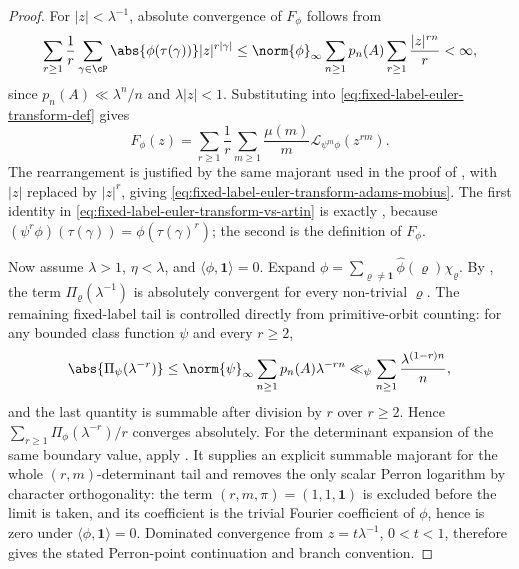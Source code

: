 \begin{proof}
  For \(|z|<\lambda^{-1}\), absolute convergence of \(F_\phi\) follows
  from
  \[
    \sum_{r\ge1}\frac{1}{r}
      \sum_{\gamma\in\cP}\abs{\phi(\tau(\gamma))}|z|^{r|\gamma|}
    \le
    \norm{\phi}_\infty
    \sum_{n\ge1}p_n(A)\sum_{r\ge1}\frac{|z|^{rn}}{r}
    <\infty,
  \]
  since \(p_n(A)\ll\lambda^n/n\) and \(\lambda|z|<1\). Substituting
   into
  \eqref{eq:fixed-label-euler-transform-def} gives
  \[
    F_\phi(z)
    =
    \sum_{r\ge1}\frac{1}{r}
      \sum_{m\ge1}\frac{\mu(m)}{m}
        \mathcal L_{\psi^m\phi}(z^{rm}).
  \]
  The rearrangement is justified by the same majorant used in the proof
  of , with \(|z|\) replaced by
  \(|z|^r\), giving \eqref{eq:fixed-label-euler-transform-adams-mobius}.
  The first identity in
  \eqref{eq:fixed-label-euler-transform-vs-artin} is exactly
  , because
  \((\psi^r\phi)(\tau(\gamma))=\phi(\tau(\gamma)^r)\); the second is the
  definition of \(F_\phi\).

  Now assume \(\lambda>1\), \(\eta<\lambda\), and
  \(\langle\phi,\mathbf1\rangle=0\). Expand
  \(\phi=\sum_{\varrho\neq\mathbf1}\widehat\phi(\varrho)\chi_\varrho\).
  By , the term
  \(\Pi_\varrho(\lambda^{-1})\) is absolutely convergent for every
  non-trivial \(\varrho\).  The remaining fixed-label tail is controlled
  directly from primitive-orbit counting: for any bounded class function
  \(\psi\) and every \(r\ge2\),
  \[
    \abs{\Pi_\psi(\lambda^{-r})}
    \le
    \norm{\psi}_\infty\sum_{n\ge1}p_n(A)\lambda^{-rn}
    \ll_\psi
    \sum_{n\ge1}\frac{\lambda^{(1-r)n}}{n},
  \]
  and the last quantity is summable after division by \(r\) over
  \(r\ge2\). Hence \(\sum_{r\ge1}\Pi_\phi(\lambda^{-r})/r\) converges
  absolutely. For the determinant expansion of the same boundary value, apply
  . It supplies an explicit
  summable majorant for the whole \((r,m)\)-determinant tail and removes
  the only scalar Perron logarithm by character orthogonality: the term
  \((r,m,\pi)=(1,1,\mathbf1)\) is excluded before the limit is taken, and
  its coefficient is the trivial Fourier coefficient of \(\phi\), hence is
  zero under \(\langle\phi,\mathbf1\rangle=0\). Dominated
  convergence from \(z=t\lambda^{-1}\), \(0<t<1\), therefore gives the
  stated Perron-point continuation and branch convention.
\end{proof}

